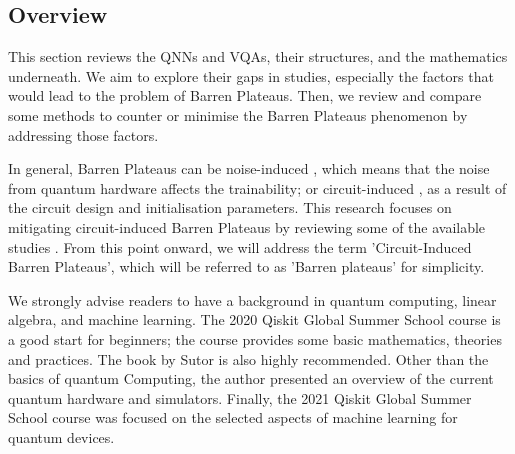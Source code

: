 \subsection{Overview}
This section reviews the QNNs and VQAs, their structures, and the mathematics underneath. 
We aim to explore their gaps in studies, especially the factors that would lead to the problem of Barren Plateaus.
Then, we review and compare some methods to counter or minimise the Barren Plateaus phenomenon by addressing those factors.

In general, Barren Plateaus can be noise-induced \cite{wangNoiseinducedBarrenPlateaus2021}, which means that the noise from quantum hardware affects the trainability; 
or circuit-induced \cite{mccleanBarrenPlateausQuantum2018}, as a result of the circuit design and initialisation parameters.
This research focuses on mitigating circuit-induced Barren Plateaus by reviewing some of the available studies \cite{pesahAbsenceBarrenPlateaus2021, cerezoCostFunctionDependent2021, skolikLayerwiseLearningQuantum2021}.
From this point onward, we will address the term 'Circuit-Induced Barren Plateaus', which will be referred to as 'Barren plateaus' for simplicity.

We strongly advise readers to have a background in quantum computing, linear algebra, and machine learning. 
The 2020 Qiskit Global Summer School course \cite{2020QiskitGlobal} is a good start for beginners; the course provides some basic mathematics, theories and practices. 
The book by Sutor \cite{sutorDancingQubitsHow2019} is also highly recommended. 
Other than the basics of quantum Computing, the author presented an overview of the current quantum hardware and simulators.
Finally, the 2021 Qiskit Global Summer School course \cite{2021QiskitGlobal} was focused on the selected aspects of machine learning for quantum devices.